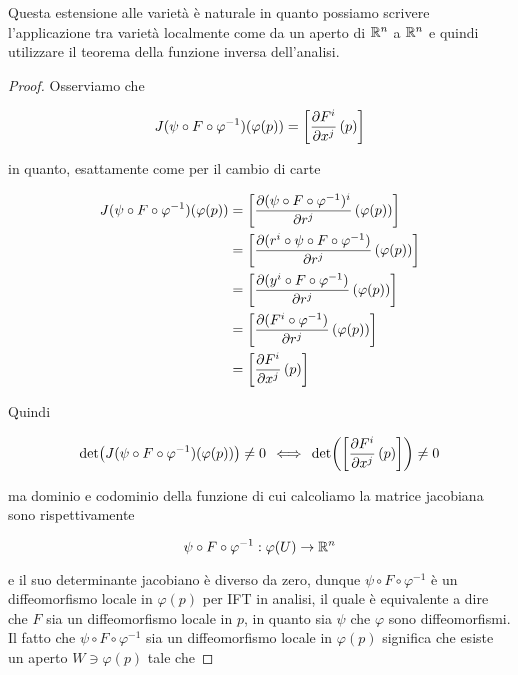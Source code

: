 Questa estensione alle varietà è naturale in quanto possiamo scrivere l'applicazione tra varietà localmente come da un aperto di $ \mathbb{R}^{n} $ a $ \mathbb{R}^{n} $ e quindi utilizzare il teorema della funzione inversa dell'analisi.

\begin{proof}
	Osserviamo che
	
	\begin{equation}
		J(\psi \circ F \circ \varphi^{-1})(\varphi(p)) = \left[ \pdv{F^{i}}{x^{j}} \, (p) \right]
	\end{equation}

	in quanto, esattamente come per il cambio di carte
	
	\begin{align}
		\begin{split}
			J(\psi \circ F \circ \varphi^{-1})(\varphi(p)) &= \left[ \pdv{(\psi \circ F \circ \varphi^{-1})^{i}}{r^{j}} \, (\varphi(p)) \right] \\
			&= \left[ \pdv{(r^{i} \circ \psi \circ F \circ \varphi^{-1})}{r^{j}} \, (\varphi(p)) \right] \\
			&= \left[ \pdv{(y^{i} \circ F \circ \varphi^{-1})}{r^{j}} \, (\varphi(p)) \right] \\
			&= \left[ \pdv{(F^{i} \circ \varphi^{-1})}{r^{j}} \, (\varphi(p)) \right] \\
			&= \left[ \pdv{F^{i}}{x^{j}} \, (p) \right]
		\end{split}
	\end{align}

	Quindi
	
	\begin{equation}
		\det( J(\psi \circ F \circ \varphi^{-1})(\varphi(p)) ) \neq 0 \, \iff \, \det( \left[ \pdv{F^{i}}{x^{j}} \, (p) \right] ) \neq 0
	\end{equation}

	ma dominio e codominio della funzione di cui calcoliamo la matrice jacobiana sono rispettivamente
	
	\begin{equation}
		\psi \circ F \circ \varphi^{-1} : \varphi(U) \to \mathbb{R}^{n}
	\end{equation}

	e il suo determinante jacobiano è diverso da zero, dunque $ \psi \circ F \circ \varphi^{-1} $ è un diffeomorfismo locale in $ \varphi(p) $ per IFT in analisi, il quale è equivalente a dire che $ F $ sia un diffeomorfismo locale in $ p $, in quanto sia $ \psi $ che $ \varphi $ sono diffeomorfismi. \\
	Il fatto che $ \psi \circ F \circ \varphi^{-1} $ sia un diffeomorfismo locale in $ \varphi(p) $ significa che esiste un aperto $ W \ni 
	\varphi(p) $ tale che
	

\end{proof}
